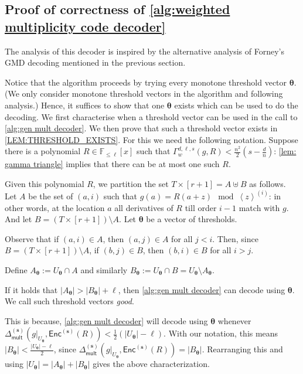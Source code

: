 \documentclass{theoretics}
\def\Field{\mathbb{F}}
\let\F\Field
\def\abs#1{\left| #1 \right|}
\newcommand{\ip}[1]{\left\langle #1 \right\rangle}
\newcommand{\enc}{{\mathsf{Enc}}}
\newcommand{\Delm}{\Delta_{\mathsf{mult}}}
\newcommand{\sbar}{\mathbf{s}}
\newcommand{\thetabar}{{\boldsymbol{\theta}}}
\begin{document}
	\subsection{Proof of correctness of \texorpdfstring{\cref{alg:weighted multiplicity code decoder}}{Algorithm 2}}
	
	The analysis of this decoder is inspired by the alternative analysis of
	Forney's GMD decoding mentioned in the previous section. 
	
	Notice that the algorithm proceeds by trying every monotone threshold vector
	$\thetabar$. (We only consider monotone threshold vectors in the algorithm and following analysis.) Hence, it suffices to show that one $\thetabar$ exists
	which can be used to do the decoding. We first characterise when a
	threshold vector can be used in the call to \cref{alg:gen mult
		decoder}. We then prove that such a threshold vector exists  in \cref{LEM:THRESHOLD_EXISTS}. For this we need the following notation. 
	Suppose there is a polynomial $R \in \F_{\leq \ell}[x]$ such that
	$\Gamma_w^{d, \ell, s}(g, R) < \frac{n^2}{2}(s-\frac{d}{n})$:
	\cref{lem: gamma triangle} implies that there can be at most one such
	$R$. 
	
	Given this polynomial $R$, we partition the set $T \times [r+1] = A
	\uplus B$ as follows. Let $A$ be the set of $(a,i)$ such
	that $g(a)=R(a+z) \mod \ip{z}^{(i)}$: in other words, at the
	location $a$ all derivatives of $R$ till order $i-1$ match with $g$. And
	let $B = (T\times [r+1]) \setminus A$. Let ${\thetabar}$ be a vector of
	thresholds. 
	
	Observe that if $(a, i) \in A$, then $(a, j) \in A$ for all $j < i$. Then, since $B = (T\times [r+1]) \setminus A$, if $(b, j) \in B$, then $(b, i) \in B$ for all $i > j$. 
	
	Define $A_\thetabar := U_\thetabar \cap A$ and similarly
	$B_\thetabar := U_\thetabar \cap B = U_\thetabar \setminus A_\thetabar$.
	
	\begin{observation}\label{obs:decodable}
		If it holds that $ \abs{A_{\thetabar}} > \abs{B_{\thetabar}} + \ell $, then \cref{alg:gen mult decoder} can decode using ${\thetabar}$. We call such threshold vectors \emph{good}. 
	\end{observation}
	
	This is because, \cref{alg:gen mult decoder} will decode using $\thetabar$ whenever  $\Delm^{(\sbar)}(g|_{U_{\thetabar}},\enc^{(\sbar)}(R)) < \frac{1}{2} (|U_{\thetabar}| - \ell)$.
	With our notation, this means $\abs{B_{{\thetabar}}} < \frac{\abs{U_{\thetabar}}-\ell}{2}$, since $\Delm^{(\sbar)}(g|_{U_{\thetabar}},\enc^{(\sbar)}(R)) = \abs{B_{{\thetabar}}}$.
	Rearranging this and using $\abs{U_{\thetabar}} = \abs{A_{\thetabar}}+\abs{B_{\thetabar}}$ gives the above characterization.
	
\end{document}
